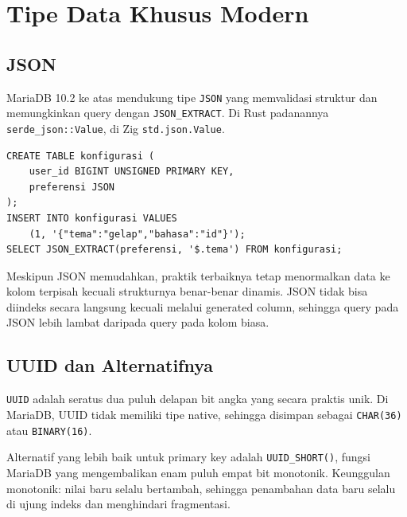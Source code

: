 \documentclass[11pt,a4paper]{article}
\begin{document}
\section{Tipe Data Khusus Modern}

\subsection{JSON}

MariaDB 10.2 ke atas mendukung tipe \texttt{JSON} yang memvalidasi struktur dan memungkinkan query dengan \texttt{JSON\_EXTRACT}. Di Rust padanannya \texttt{serde\_json::Value}, di Zig \texttt{std.json.Value}.

\begin{lstlisting}[style=code]
CREATE TABLE konfigurasi (
    user_id BIGINT UNSIGNED PRIMARY KEY,
    preferensi JSON
);
INSERT INTO konfigurasi VALUES
    (1, '{"tema":"gelap","bahasa":"id"}');
SELECT JSON_EXTRACT(preferensi, '$.tema') FROM konfigurasi;
\end{lstlisting}

Meskipun JSON memudahkan, praktik terbaiknya tetap menormalkan data ke kolom terpisah kecuali strukturnya benar-benar dinamis. JSON tidak bisa diindeks secara langsung kecuali melalui generated column, sehingga query pada JSON lebih lambat daripada query pada kolom biasa.

\subsection{UUID dan Alternatifnya}

\texttt{UUID} adalah seratus dua puluh delapan bit angka yang secara praktis unik. Di MariaDB, UUID tidak memiliki tipe native, sehingga disimpan sebagai \texttt{CHAR(36)} atau \texttt{BINARY(16)}.

Alternatif yang lebih baik untuk primary key adalah \texttt{UUID\_SHORT()}, fungsi MariaDB yang mengembalikan enam puluh empat bit monotonik. Keunggulan monotonik: nilai baru selalu bertambah, sehingga penambahan data baru selalu di ujung indeks dan menghindari fragmentasi.
\end{document}
